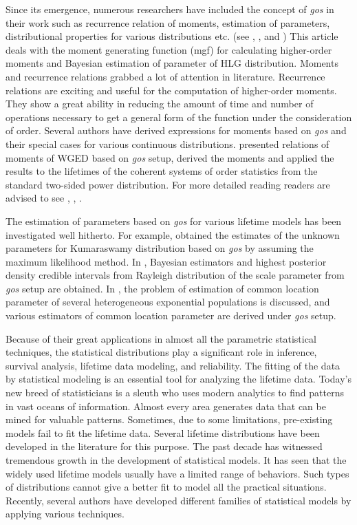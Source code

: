 \documentclass[11pt,a4paper]{article}
\numberwithin{equation}{section}
\begin{document}
	Since its emergence, numerous researchers have included the concept of \textit{gos} in their work such as recurrence relation of moments, estimation of parameters, distributional properties for various distributions etc. (see \cite{aboeleneen2010inference}, \cite{burkschat2009linear}, \cite{gupta2019inference} and \cite{arshad2021bayesian}  ) This article deals with the moment generating function (mgf) for calculating higher-order moments and Bayesian estimation of parameter of HLG distribution. Moments and recurrence relations grabbed a lot of attention in literature. Recurrence relations are exciting and useful for the computation of higher-order moments. They show a great ability in reducing the amount of time and number of operations necessary to get a general form of the function under the consideration of order. Several authors have derived expressions for moments based on \textit{gos} and their special cases for various continuous distributions. \cite{gupta2019inference} presented relations of moments of WGED based on \textit{gos} setup, \cite{akhter2020moments}  derived the moments and applied the results to the lifetimes of the coherent systems of order statistics from the standard two-sided power distribution. For more detailed reading readers are advised to see \cite{singh2021exact}, \cite{alharbi2021moment}, \cite{khatoon2021moments}.\par

	The estimation of parameters based on \textit{gos} for various lifetime models has been investigated well hitherto. For example, \cite{safi2013generalized} obtained the estimates of the unknown parameters for Kumaraswamy distribution based on \textit{gos} by assuming the maximum likelihood method. In \cite{kim2014bayesian}, Bayesian estimators and highest posterior density credible intervals from Rayleigh distribution of the scale parameter from \textit{gos} setup are obtained. In \cite{azhad2020estimation}, the problem of estimation of common location parameter of several heterogeneous exponential populations is discussed, and various estimators of common location parameter are derived under \textit{gos} setup.\par

	Because of their great applications in almost all the parametric statistical techniques, the statistical distributions play a significant role in inference, survival analysis, lifetime data modeling, and reliability. The fitting of the data by statistical modeling is an essential tool for analyzing the lifetime data. Today's new breed of statisticians is a sleuth who uses modern analytics to find patterns in vast oceans of information. Almost every area generates data that can be mined for valuable patterns. Sometimes, due to some limitations, pre-existing models fail to fit the lifetime data. Several lifetime distributions have been developed in the literature for this purpose. The past decade has witnessed tremendous growth in the development of statistical models. It has seen that the widely used lifetime models usually have a limited range of behaviors. Such types of distributions cannot give a better fit to model all the practical situations. Recently, several authors have developed different families of statistical models by applying various techniques.
\end{document}
